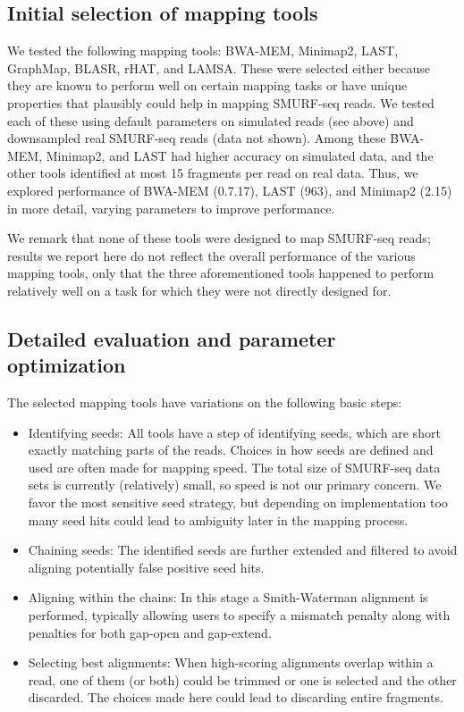 \subsection{Initial selection of mapping tools}
We tested the following mapping tools: BWA-MEM\cite{li2013aligning},
Minimap2\cite{li2018minimap2}, LAST\cite{kielbasa2011adaptive},
GraphMap\cite{sovic2016fast}, BLASR\cite{chaisson2012mapping},
rHAT\cite{liu2015rhat}, and LAMSA\cite{liu2017lamsa}. These were
selected either because they are known to perform well on certain
mapping tasks or have unique properties that plausibly could help in
mapping SMURF-seq reads. We tested each of these using default
parameters on simulated reads (see above) and downsampled real SMURF-seq
reads (data not shown). Among these BWA-MEM, Minimap2, and LAST had
higher accuracy on simulated data, and the other tools identified at
most 15 fragments per read on real data. Thus, we explored performance
of BWA-MEM (0.7.17), LAST (963), and Minimap2 (2.15) in more detail,
varying parameters to improve performance.

We remark that none of these tools were designed to map SMURF-seq reads;
results we report here do not reflect the overall performance of the
various mapping tools, only that the three aforementioned tools happened
to perform relatively well on a task for which they were not directly
designed for.


\subsection{Detailed evaluation and parameter optimization}
The selected mapping tools have variations on the following basic
steps:
\begin{itemize}
\item Identifying seeds: All tools have a step of identifying seeds, which
  are short exactly matching parts of the reads. Choices in how seeds
  are defined and used are often made for mapping speed. The total
  size of SMURF-seq data sets is currently (relatively) small, so
  speed is not our primary concern. We favor the most sensitive seed
  strategy, but depending on implementation too many seed hits could
  lead to ambiguity later in the mapping process.
\item Chaining seeds: The identified seeds are further extended
  and filtered to avoid aligning potentially false positive seed hits.
\item Aligning within the chains: In this stage a Smith-Waterman
  alignment is performed, typically allowing users to specify a
  mismatch penalty along with penalties for both gap-open and
  gap-extend.
\item Selecting best alignments: When high-scoring alignments overlap
  within a read, one of them (or both) could be trimmed or one is selected
  and the other discarded. The choices made here could lead to
  discarding entire fragments.
\end{itemize}

